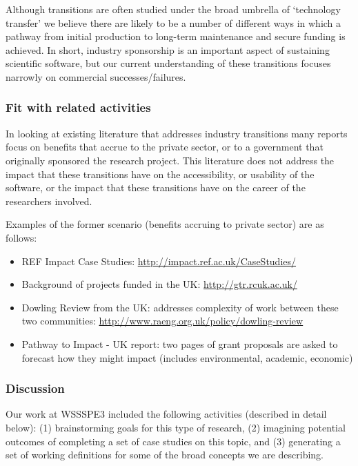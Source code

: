 Although transitions are often studied under the broad umbrella of `technology
transfer' we believe there are likely to be a number of different ways in which
a pathway from initial production to long-term maintenance and secure funding is
achieved. In short, industry sponsorship is an important aspect of sustaining
scientific software, but our current understanding of these transitions focuses
narrowly on commercial successes\slash failures.

\subsubsection{Fit with related activities}

In looking at existing literature that addresses industry transitions many
reports focus on benefits that accrue to the private sector, or to a government
that originally sponsored the research project. This literature does not address
the impact that these transitions have on the accessibility, or usability of the
software, or the impact that these transitions have on the career of the
researchers involved.

Examples of the former scenario (benefits accruing to private sector) are as
follows:
\begin{itemize}
\item REF Impact Case Studies: \url{http://impact.ref.ac.uk/CaseStudies/}
\item Background of projects funded in the UK: \url{http://gtr.rcuk.ac.uk/}
\item Dowling Review from the UK: addresses complexity of work between these two
communities: \url{http://www.raeng.org.uk/policy/dowling-review}
\item Pathway to Impact - UK report: two pages of grant proposals are asked to
forecast how they might impact (includes environmental, academic, economic)
\end{itemize}

\subsubsection{Discussion}

Our work at WSSSPE3 included the following activities (described in detail
below): (1) brainstorming goals for this type of research, (2) imagining
potential outcomes of completing a set of case studies on this topic, and (3)
generating a set of working definitions for some of the broad concepts we are
describing.

